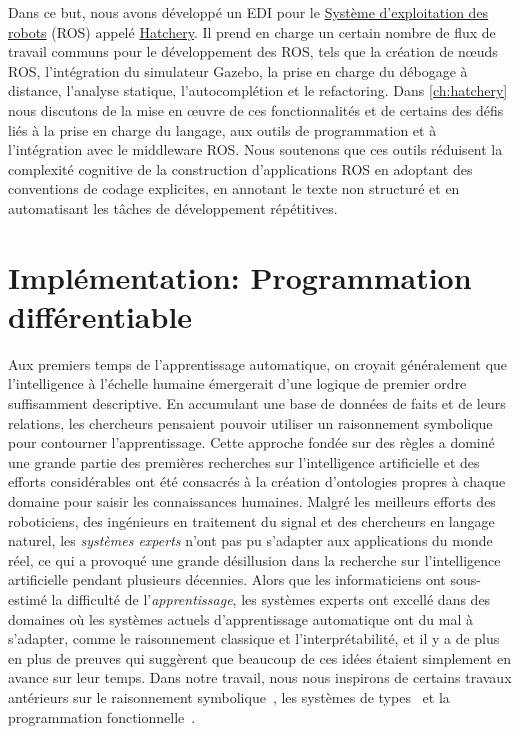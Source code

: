 Dans ce but, nous avons développé un EDI pour le \href{https://www.ros.org/}{Système d'exploitation des robots} (ROS) appelé \href{https://github.com/duckietown/hatchery}{Hatchery}. Il prend en charge un certain nombre de flux de travail communs pour le développement des ROS, tels que la création de nœuds ROS, l'intégration du simulateur Gazebo, la prise en charge du débogage à distance, l'analyse statique, l'autocomplétion et le refactoring. Dans \autoref{ch:hatchery} nous discutons de la mise en œuvre de ces fonctionnalités et de certains des défis liés à la prise en charge du langage, aux outils de programmation et à l'intégration avec le middleware ROS. Nous soutenons que ces outils réduisent la complexité cognitive de la construction d'applications ROS en adoptant des conventions de codage explicites, en annotant le texte non structuré et en automatisant les tâches de développement répétitives.

\section{Implémentation: Programmation différentiable}

Aux premiers temps de l'apprentissage automatique, on croyait généralement que l'intelligence à l'échelle humaine émergerait d'une logique de premier ordre suffisamment descriptive. En accumulant une base de données de faits et de leurs relations, les chercheurs pensaient pouvoir utiliser un raisonnement symbolique pour contourner l'apprentissage. Cette approche fondée sur des règles a dominé une grande partie des premières recherches sur l'intelligence artificielle et des efforts considérables ont été consacrés à la création d'ontologies propres à chaque domaine pour saisir les connaissances humaines. Malgré les meilleurs efforts des roboticiens, des ingénieurs en traitement du signal et des chercheurs en langage naturel, les \textit{systèmes experts} n'ont pas pu s'adapter aux applications du monde réel, ce qui a provoqué une grande désillusion dans la recherche sur l'intelligence artificielle pendant plusieurs décennies. Alors que les informaticiens ont sous-estimé la difficulté de l'\textit{apprentissage}, les systèmes experts ont excellé dans des domaines où les systèmes actuels d'apprentissage automatique ont du mal à s'adapter, comme le raisonnement classique et l'interprétabilité, et il y a de plus en plus de preuves qui suggèrent que beaucoup de ces idées étaient simplement en avance sur leur temps. Dans notre travail, nous nous inspirons de certains travaux antérieurs sur le raisonnement symbolique~\citep{dwyer1948symbolic, glushkov1971analitik}, les systèmes de types~\citep{lof1973intuitionistic,jay1996shape} et la programmation fonctionnelle~\citep{mccarthy1960recursive, abelson1996structure}.


